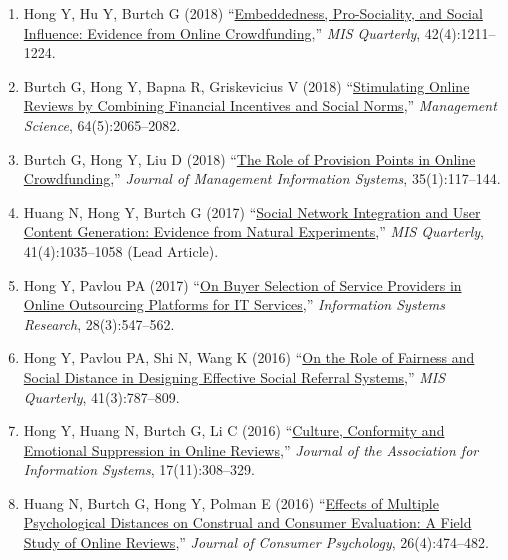 \documentclass[paper=letter,fontsize=10pt]{scrartcl} %
\newcommand{\PaperEntry}[6]{
		\noindent #1 (#2) ``\href{#6}{#3},'' \textit{#4}, #5.} %
\newcommand{\Hong}{Hong Y}
\begin{document}
\begin{enumerate}
\item \PaperEntry{\Hong, Hu Y, Burtch G}{2018}{Embeddedness, Pro-Sociality, and Social Influence: Evidence from Online Crowdfunding}{MIS Quarterly}{42(4):1211--1224}{https://papers.ssrn.com/sol3/papers.cfm?abstract_id=3125936}

\item \PaperEntry{Burtch G, \Hong, Bapna R, Griskevicius V}{2018}{Stimulating Online Reviews by Combining Financial Incentives and Social Norms}{Management Science}{64(5):2065--2082}{http://pubsonline.informs.org/doi/abs/10.1287/mnsc.2016.2715}

\item \PaperEntry{Burtch G, \Hong, Liu D}{2018}{The Role of Provision Points in Online Crowdfunding}{Journal of Management Information Systems}{35(1):117--144}{https://www.tandfonline.com/doi/full/10.1080/07421222.2018.1440764}

\item \PaperEntry{Huang N, \Hong, Burtch G}{2017}{Social Network Integration and User Content Generation: Evidence from Natural Experiments}{MIS Quarterly}{41(4):1035--1058 (Lead Article)}{https://misq.org/social-network-integration-and-user-content-generation-evidence-from-natural-experiments.html}

\item \PaperEntry{\Hong, Pavlou PA}{2017}{On Buyer Selection of Service Providers in Online Outsourcing Platforms for IT Services}{Information Systems Research}{28(3):547--562}{http://pubsonline.informs.org/doi/abs/10.1287/isre.2017.0709}

\item \PaperEntry{\Hong, Pavlou PA, Shi N, Wang K}{2016}{On the Role of Fairness and Social Distance in Designing Effective Social Referral Systems}{MIS Quarterly}{41(3):787--809}{https://misq.org/on-the-role-of-fairness-and-social-distance-in-designing-effective-social-referral-systems.html}

\item \PaperEntry{\Hong, Huang N, Burtch G, Li C}{2016}{Culture, Conformity and Emotional Suppression in Online Reviews}{Journal of the Association for Information Systems}{17(11):308--329}{http://aisel.aisnet.org/jais/vol17/iss11/2/}

\item \PaperEntry{Huang N, Burtch G, \Hong, Polman E}{2016}{Effects of Multiple Psychological Distances on Construal and Consumer Evaluation: A Field Study of Online Reviews}{Journal of Consumer Psychology}{26(4):474--482}{https://doi.org/10.1016/j.jcps.2016.03.001}


\end{enumerate}
\end{document}
